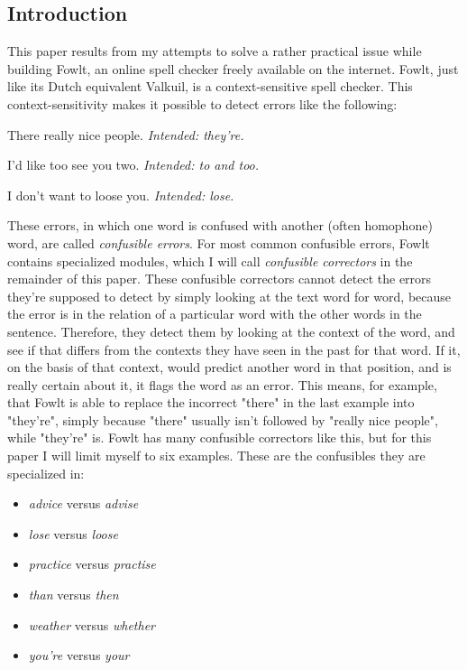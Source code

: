 \documentclass[12pt]{article}
\begin{document}
\subsection{Introduction}

This paper results from my attempts to solve a rather practical issue while building Fowlt, an online spell checker freely available on the internet. Fowlt, just like its Dutch equivalent Valkuil, is a context-sensitive spell checker. This context-sensitivity makes it possible to detect errors like the following:

\begin{examples}

\item There really nice people. \emph{Intended: they're.}
\item I'd like too see you two. \emph{Intended: to and too.}
\item I don't want to loose you. \emph{Intended: lose.}

\end{examples}

These errors, in which one word is confused with another (often homophone) word, are called \emph{confusible errors}. For most common confusible errors, Fowlt contains specialized modules, which I will call \emph{confusible correctors} in the remainder of this paper. These confusible correctors cannot detect the errors they're supposed to detect by simply looking at the text word for word, because the error is in the relation of a particular word with the other words in the sentence. Therefore, they detect them by looking at the context of the word, and see if that differs from the contexts they have seen in the past for that word. If it, on the basis of that context, would predict another word in that position, and is really certain about it, it flags the word as an error. This means, for example, that Fowlt is able to replace the incorrect "there" in the last example into "they're", simply because "there" usually isn't followed by "really nice people", while "they're" is. Fowlt has many confusible correctors like this, but for this paper I will limit myself to six examples. These are the confusibles they are specialized in: 

\begin{itemize}
\item \emph{advice} versus \emph{advise}
\item \emph{lose} versus \emph{loose}
\item \emph{practice} versus \emph{practise}
\item \emph{than} versus \emph{then}
\item \emph{weather} versus \emph{whether}
\item \emph{you're} versus \emph{your}
\end{itemize}
\end{document}
